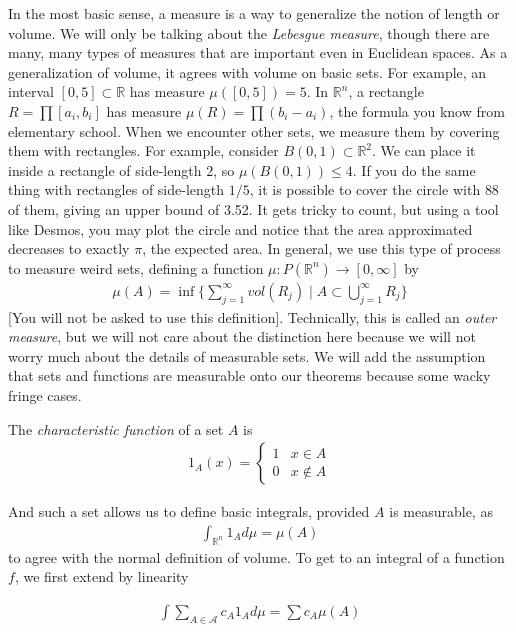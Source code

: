\documentclass{article}
\newcommand{\R}{{\mathbb{R}}}
\begin{document}
	
	In the most basic sense, a measure is a way to generalize the notion of length or volume. We will only be talking about the \textit{Lebesgue measure}, though there are many, many types of measures that are important even in Euclidean spaces. As a generalization of volume, it agrees with volume on basic sets. For example, an interval $[0,5] \subset \R$ has measure $\mu([0,5]) = 5$. In $\R^{n}$, a rectangle $R = \prod [a_i,b_i]$ has measure $\mu(R) = \prod (b_{i}-a_i)$, the formula you know from elementary school. When we encounter other sets, we measure them by covering them with rectangles. For example, consider $B(0,1) \subset \R^{2}$. We can place it inside a rectangle of side-length $2$, so $\mu(B(0,1)) \leq 4$. If you do the same thing with rectangles of side-length $1/5$, it is possible to cover the circle with $88$ of them, giving an upper bound of 3.52. It gets tricky to count, but using a tool like Desmos, you may plot the circle and notice that the area approximated decreases to exactly $\pi$, the expected area. In general, we use this type of process to measure weird sets, defining a function $\mu: P(\R^{n}) \to [0,\infty]$ by 
	\begin{align*}
		\mu(A) = \inf \{ \sum_{j=1}^{\infty} vol(R_{j}) \mid A \subset \bigcup_{j=1}^{\infty} R_{j}\}
	\end{align*} 
	[You will not be asked to use this definition]. Technically, this is called an \textit{outer measure}, but we will not care about the distinction here because we will not worry much about the details of measurable sets. We will add the assumption that sets and functions are measurable onto our theorems because some wacky fringe cases.
	
	The \textit{characteristic function } of a set $A$ is 
	\begin{align*}
		1_{A}(x) = \begin{cases} 1 & x \in A \\ 0 & x \notin A \end{cases}
	\end{align*}
	
	And such a set allows us to define basic integrals, provided $A$ is measurable, as
	\begin{align*}
		\int_{\R^{n}} 1_{A} d\mu = \mu(A)
	\end{align*}
	to agree with the normal definition of volume. To get to an integral of a function $f$, we first extend by linearity
	
	\begin{align*}
		\int \sum_{A \in \mathcal{A}} c_{A} 1_{A} d\mu = \sum c_{A} \mu (A)
	\end{align*}
	
\end{document}
